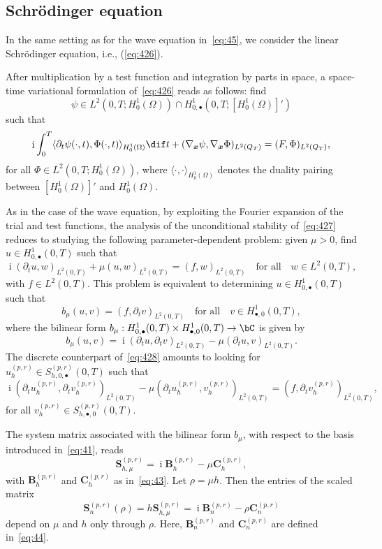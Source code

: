 \documentclass[addpoints,12pt,letter]{article}
\DeclareMathOperator{\mi}{i} %
\newcommand{\bx}{\boldsymbol{x}}
\newcommand{\Om}{\Omega}
\newcommand{\Ph}{\Phi}
\newcommand{\TF}{T}
\renewcommand{\d}{\dif}
\numberwithin{equation}{section}
\theoremstyle{definition}
\begin{document}
\subsection{Schrödinger equation} \label{sec:schro}

In the same setting as for the wave equation in~\eqref{eq:45}, we consider the linear Schrödinger equation, i.e., (\ref{eq:426}).

After multiplication by a test function and integration by parts in space, a space-time variational formulation of~\eqref{eq:426} reads as follows: find
\[
\psi\in L^{2}(0,\TF ;H^{1}_{0}(\Om))\cap H^{1}_{0,\bullet}(0,\TF ;[H_{0}^{1}(\Om)]')
\] such that
\begin{equation}\label{eq:427}
\mi\int_{0}^{\TF}\langle\partial_{t}\psi(\cdot,t),\Ph(\cdot,t)\rangle_{H^{1}_{0}(\Om)}\d t+(\nabla_{\bx}\psi,\nabla_{\bx}\Ph)_{L^{2}(Q_{\TF})}
=(F,\Ph)_{L^{2}(Q_{\TF})},
\end{equation}
for all $\Ph\in L^{2}(0,\TF;H^{1}_{0}(\Om))$, where $\langle\cdot,\cdot\rangle_{H^{1}_{0}(\Om)}$ denotes the duality pairing between $[H_{0}^{1}(\Om)]'$ and $H_{0}^{1}(\Om)$.

As in the case of the wave equation, by exploiting the Fourier expansion of the trial and test functions, the analysis of the unconditional stability of~\eqref{eq:427} reduces to studying the following parameter-dependent problem: given $\mu>0$, find $u\in H^{1}_{0,\bullet}(0,\TF)$ such that
\[
\mi (\partial_{t} u, w)_{L^{2}(0,\TF)}+\mu (u, w)_{L^{2}(0,\TF)}=(f, w)_{L^{2}(0,\TF)}\quad\text{for all}\quad w\in L^{2}(0,\TF),
\]
with $f\in L^{2}(0,\TF)$.
This problem is equivalent to determining $u\in H^{1}_{0,\bullet}(0,\TF)$ such that
\begin{equation}\label{eq:428}
b_{\mu}(u,v)=(f,\partial_{t} v)_{L^{2}(0,\TF)}\quad\text{for all}\quad v\in H^{1}_{\bullet,0}(0,\TF),
\end{equation}
where the bilinear form $b_{\mu}:H^{1}_{0,\bullet}(0,\TF)\times H^{1}_{\bullet,0}(0,\TF)\to\bC$ is given by
\[
b_{\mu}(u,v)=\mi (\partial_{t} u,\partial_{t} v)_{L^{2}(0,\TF)}-\mu (\partial_{t} u, v)_{L^{2}(0,\TF)}.
\]
The discrete counterpart of~\eqref{eq:428} amounts to looking for $u_{h}^{(p,r)}\in S_{h,0,\bullet}^{(p,r)}(0,\TF)$ such that
\[
\mi (\partial_{t} u_{h}^{(p,r)},\partial_{t} v_{h}^{(p,r)})_{L^{2}(0,\TF)}-\mu (\partial_{t} u_{h}^{(p,r)},v_{h}^{(p,r)})_{L^{2}(0,\TF)}=(f,\partial_{t} v_{h}^{(p,r)})_{L^{2}(0,\TF)},
\]
for all $v_{h}^{(p,r)}\in S_{h,\bullet,0}^{(p,r)}(0,\TF)$.

The system matrix associated with the bilinear form $b_{\mu}$, with respect to the basis introduced in~\eqref{eq:41}, reads
\[
\mathbf{S}_{h,\mu}^{(p,r)}=\mi\mathbf{B}_{h}^{(p,r)}-\mu\mathbf{C}_{h}^{(p,r)},
\]
with $\mathbf{B}_{h}^{(p,r)}$ and $\mathbf{C}_{h}^{(p,r)}$ as in~\eqref{eq:43}.
Let $\rho=\mu h$.
Then the entries of the scaled matrix
\begin{equation} \label{eq:Sn}
\mathbf{S}_{n}^{(p,r)}(\rho)=h\mathbf{S}_{h,\mu}^{(p,r)}=\mi\mathbf{B}_{n}^{(p,r)}-\rho\mathbf{C}_{n}^{(p,r)}
\end{equation}
depend on $\mu$ and $h$ only through $\rho$.
Here, $\mathbf{B}_{n}^{(p,r)}$ and $\mathbf{C}_{n}^{(p,r)}$ are defined in~\eqref{eq:44}.
\end{document}
